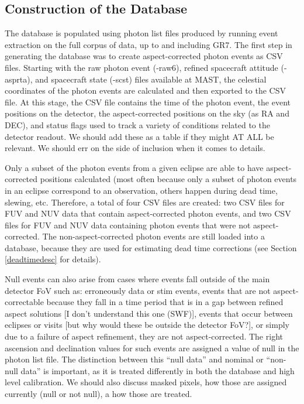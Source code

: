\documentclass[5p]{elsarticle}
\begin{document}
\subsection{Construction of the Database}
The database is populated using photon list files produced by running event extraction on the full corpus of data, up to and including GR7.  The first step in generating the database was to create aspect-corrected photon events as CSV files.  Starting with the raw photon event (-raw6), refined spacecraft attitude (-asprta), and spacecraft state (-scst) files available at MAST, the celestial coordinates of the photon events are calculated and then exported to the CSV file.  At this stage, the CSV file contains the time of the photon event, the event positions on the detector, the aspect-corrected positions on the sky (as RA and DEC), and status flags used to track a variety of conditions related to the detector readout. {\color{red}We should add these as a table if they might AT ALL be relevant.  We should err on the side of inclusion when it comes to details.}

Only a subset of the photon events from a given eclipse are able to have aspect-corrected positions calculated (most often because only a subset of photon events in an eclipse correspond to an observation, others happen during dead time, slewing, etc.  Therefore, a total of four CSV files are created: two CSV files for FUV and NUV data that contain aspect-corrected photon events, and two CSV files for FUV and NUV data containing photon events that were not aspect-corrected.  The non-aspect-corrected photon events are still loaded into a database, because they are used for estimating dead time corrections (see Section \ref{deadtimedesc} for details).

Null events can also arise from cases where events fall outside of the main detector FoV such as: erroneously data or stim events, {\color{red}events that are not aspect-correctable because they fall in a time period that is in a gap between refined aspect solutions [I don't understand this one (SWF)]}, events that occur between eclipses or visits {\color{red}[but why would these be outside the detector FoV?]}, or simply due to a failure of aspect refinement, they are not aspect-corrected. The right ascension and declination values for such events are assigned a value of null in the photon list file. The distinction between this ``null data'' and nominal or ``non-null data'' is important, as it is treated differently in both the database and high level calibration.  {\color{red}We should also discuss masked pixels, how those are assigned currently (null or not null), a how those are treated.}
\end{document}
